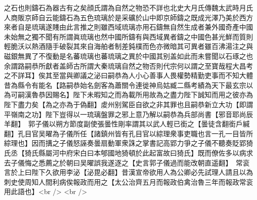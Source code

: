 之石也則鑄石為器古有之矣顔氏謂為自然之物恐不詳也北史大月氏傳魏太武時月氏人商販京師自云能鑄石為五色琉璃於是采礦於山中即京師鑄之既成光澤乃美於西方來者自是琉璃遂賤由此言推之則雖西域琉璃亦用石鑄無自然生成者兼外國奇產中國未始無之獨不聞有所謂眞琉璃也然中國所鑄有與西域異者鑄之中國色甚光鮮而質則輕脆沃以熱酒隨手破裂其來自海舶者制差鈍樸而色亦微暗其可異者雖百沸湯注之與磁銀無異了不復動是名蕃琉璃也蕃琉璃之異於中國其别盖如此而未嘗聞以石琢之也余謂路嗣恭所獻者盖師古所謂大秦琉璃自然之物否則代宗何以謂之至寶哉程大昌考之不詳耳】俟其至當與卿議之泌曰嗣恭為人小心善事人畏權勢精勤吏事而不知大體昔為縣令有能名【路嗣恭始名劍客為蕭關令連徙神烏姑臧二縣考績為天下最玄宗以為可嗣漢魯恭因賜名】陛下未暇知之而為載所用故為之盡力陛下誠知而用之彼亦為陛下盡力矣【為之亦為于偽翻】䖍州别駕臣自欲之非其罪也且嗣恭新立大功【即謂平嶺南之功】陛下豈得以一琉璃盤罪之邪上意乃解以嗣恭為兵部尚書【邪音耶尚辰羊翻】　郭子儀以朔方節度副使張曇性剛率謂其以武人輕已銜之【曇徒含翻銜戶緘翻】孔目官吴曜為子儀所任【諸鎮州皆有孔目官以綜理衆事吏職也言一孔一目皆所綜理也】因而搆之子儀怒誣奏曇扇動軍衆誅之掌書記高郢力爭之子儀不聽奏貶郢猗氏丞【猗氏縣屬河中府宋白曰本郇國地猗頓於此起富故曰猗氏】既而僚佐多以病求去子儀悔之悉薦之於朝曰吴曜誤我遂逐之【史言郭子儀過而能改朝直遥翻】　常衮言於上曰陛下久欲用李泌【泌毘必翻】昔漢宣帝欲用人為公卿必先試理人請且以為刺史使周知人間利病俟報政而用之【太公治齊五月而報政伯禽治魯三年而報政常衮用此語也】<br />
<br />
